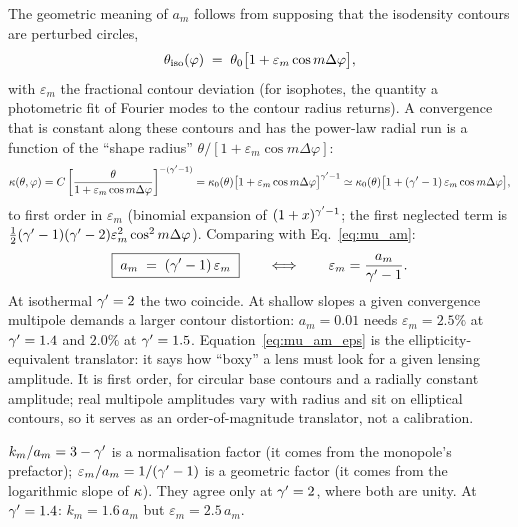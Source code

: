 The geometric meaning of $a_m$ follows from supposing that the
isodensity contours are perturbed circles,
\begin{equation}
    \theta_{\rm iso}(\varphi) \;=\; \theta_0\big[1 + \varepsilon_m\cos m\Delta\varphi\big],
    \label{eq:mu_iso_contour}
\end{equation}
with $\varepsilon_m$ the fractional contour deviation (for
isophotes, the quantity a photometric fit of Fourier modes to the
contour radius returns).  A convergence
that is constant along these contours and has the power-law radial run
is a function of the ``shape radius''
$\theta/[1+\varepsilon_m\cos m\Delta\varphi]$:
\begin{equation}
    \kappa(\theta,\varphi)
    = C\left[\frac{\theta}{1+\varepsilon_m\cos m\Delta\varphi}\right]^{-(\gamma'-1)}
    = \kappa_0(\theta)\big[1+\varepsilon_m\cos m\Delta\varphi\big]^{\gamma'-1}
    \simeq \kappa_0(\theta)\big[1 + (\gamma'-1)\,\varepsilon_m\cos m\Delta\varphi\big],
    \label{eq:mu_iso_expand}
\end{equation}
to first order in $\varepsilon_m$ (binomial expansion of $(1+x)^{\gamma'-1}$;
the first neglected term is $\tfrac12(\gamma'-1)(\gamma'-2)\varepsilon_m^2\cos^2
m\Delta\varphi$).  Comparing with Eq.~\eqref{eq:mu_am}:
\begin{equation}
    \boxed{\; a_m \;=\; (\gamma'-1)\,\varepsilon_m \;}
    \qquad\Longleftrightarrow\qquad
    \varepsilon_m = \frac{a_m}{\gamma'-1}.
    \label{eq:mu_am_eps}
\end{equation}
At isothermal $\gamma'=2$ the two coincide.  At shallow slopes a given
convergence multipole demands a larger contour distortion:
$a_m = 0.01$ needs $\varepsilon_m = 2.5\%$ at $\gamma'=1.4$ and $2.0\%$ at
$\gamma'=1.5$.  Equation~\eqref{eq:mu_am_eps} is the ellipticity-equivalent
translator: it says how ``boxy'' a lens must look for a given
lensing amplitude.  It is first order, for circular base contours and
a radially constant amplitude; real multipole amplitudes vary with
radius and sit on elliptical contours, so it serves as an
order-of-magnitude translator, not a calibration.

\begin{annotation}
$k_m/a_m = 3-\gamma'$ is a normalisation factor (it comes from the
monopole's prefactor); $\varepsilon_m/a_m = 1/(\gamma'-1)$ is a
geometric factor (it comes from the logarithmic slope of
$\kappa$).  They agree only at $\gamma'=2$, where both are unity.  At
$\gamma'=1.4$: $k_m = 1.6\,a_m$ but $\varepsilon_m = 2.5\,a_m$.
\end{annotation}


